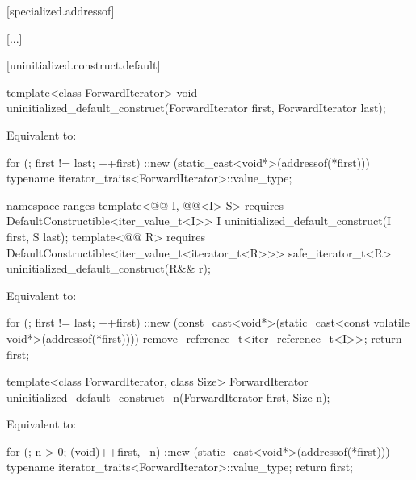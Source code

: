 [specialized.addressof]{}

[...]

[uninitialized.construct.default]{}

%
\begin{itemdecl}
template<class ForwardIterator>
  void uninitialized_default_construct(ForwardIterator first, ForwardIterator last);
\end{itemdecl}

\begin{itemdescr}
\pnum
\effects
Equivalent to:
\begin{codeblock}
for (; first != last; ++first)
  ::new (static_cast<void*>(addressof(*first)))
    typename iterator_traits<ForwardIterator>::value_type;
\end{codeblock}
\end{itemdescr}

\begin{addedblock}
%
\begin{itemdecl}
namespace ranges {
  template<@@ I, @@<I> S>
      requires DefaultConstructible<iter_value_t<I>>
    I uninitialized_default_construct(I first, S last);
  template<@@ R>
      requires DefaultConstructible<iter_value_t<iterator_t<R>>>
    safe_iterator_t<R> uninitialized_default_construct(R&& r);
}
\end{itemdecl}

\begin{itemdescr}
\pnum
\effects Equivalent to:
\begin{codeblock}
for (; first != last; ++first)
  ::new (const_cast<void*>(static_cast<const volatile void*>(addressof(*first))))
    remove_reference_t<iter_reference_t<I>>;
return first;
\end{codeblock}
\end{itemdescr}
\end{addedblock}

%
\begin{itemdecl}
template<class ForwardIterator, class Size>
  ForwardIterator uninitialized_default_construct_n(ForwardIterator first, Size n);
\end{itemdecl}

\begin{itemdescr}
\pnum
\effects
Equivalent to:
\begin{codeblock}
for (; n > 0; (void)++first, --n)
  ::new (static_cast<void*>(addressof(*first)))
    typename iterator_traits<ForwardIterator>::value_type;
return first;
\end{codeblock}
\end{itemdescr}

